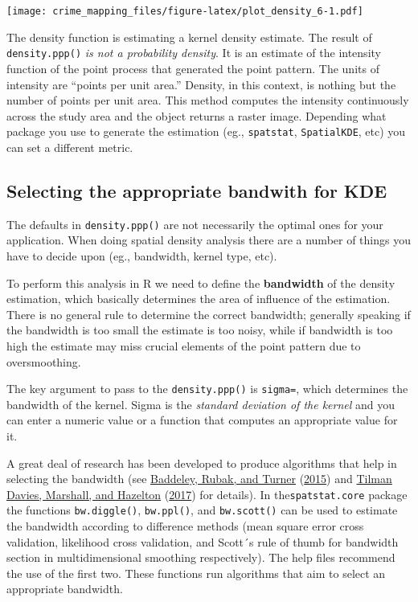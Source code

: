 \documentclass[
  krantz2]{krantz}
\begin{document}
\texttt{[image: crime\_mapping\_files/figure-latex/plot\_density\_6-1.pdf]}

The density function is estimating a kernel density estimate. The result of \texttt{density.ppp()} \emph{is not a probability density}. It is an estimate of the intensity function of the point process that generated the point pattern. The units of intensity are ``points per unit area.'' Density, in this context, is nothing but the number of points per unit area. This method computes the intensity continuously across the study area and the object returns a raster image. Depending what package you use to generate the estimation (eg., \texttt{spatstat}, \texttt{SpatialKDE}, etc) you can set a different metric.

\hypertarget{selecting-the-appropriate-bandwith-for-kde}{%
\subsection{Selecting the appropriate bandwith for KDE}\label{selecting-the-appropriate-bandwith-for-kde}}

The defaults in \texttt{density.ppp()} are not necessarily the optimal ones for your application. When doing spatial density analysis there are a number of things you have to decide upon (eg., bandwidth, kernel type, etc).

To perform this analysis in R we need to define the \textbf{bandwidth} of the density estimation, which basically determines the area of influence of the estimation. There is no general rule to determine the correct bandwidth; generally speaking if the bandwidth is too small the estimate is too noisy, while if bandwidth is too high the estimate may miss crucial elements of the point pattern due to oversmoothing.

The key argument to pass to the \texttt{density.ppp()} is \texttt{sigma=}, which determines the bandwidth of the kernel. Sigma is the \emph{standard deviation of the kernel} and you can enter a numeric value or a function that computes an appropriate value for it.

A great deal of research has been developed to produce algorithms that help in selecting the bandwidth (see \protect\hyperlink{ref-Baddeley_2016}{Baddeley, Rubak, and Turner} (\protect\hyperlink{ref-Baddeley_2016}{2015}) and \protect\hyperlink{ref-Davies_2017}{Tilman Davies, Marshall, and Hazelton} (\protect\hyperlink{ref-Davies_2017}{2017}) for details). In the\texttt{spatstat.core} package the functions \texttt{bw.diggle()}, \texttt{bw.ppl()}, and \texttt{bw.scott()} can be used to estimate the bandwidth according to difference methods (mean square error cross validation, likelihood cross validation, and Scott´s rule of thumb for bandwidth section in multidimensional smoothing respectively). The help files recommend the use of the first two. These functions run algorithms that aim to select an appropriate bandwidth.
\end{document}
